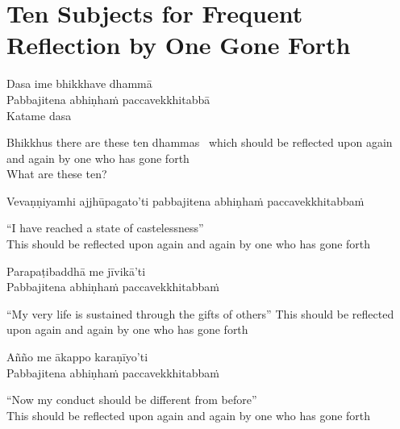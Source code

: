 \section{Ten Subjects for Frequent Reflection by One Gone Forth}
\label{ten-recollections}

\begin{leader}
\end{leader}

Dasa ime bhikkhave dhammā\\
Pabbajitena abhiṇhaṁ paccavekkhitabbā\\
Katame dasa

\begin{english}
  Bhikkhus there are these ten dhammas
  \breathmark\ which should be reflected upon again and again by one who has gone forth\\
  What are these ten?
\end{english}

Vevaṇṇiyamhi ajjhūpagato'ti pabbajitena abhiṇhaṁ paccavekkhitabbaṁ

\begin{english}
  “I have reached a state of castelessness”\\
  This should be reflected upon again and again by one who has gone forth
\end{english}

Parapaṭibaddhā me jīvikā’ti\\
Pabbajitena abhiṇhaṁ paccavekkhitabbaṁ

\begin{english}
  “My very life is sustained through the gifts of others”
  This should be reflected upon again and again by one who has gone forth
\end{english}

Añño me ākappo karaṇīyo'ti\\
Pabbajitena abhiṇhaṁ paccavekkhitabbaṁ

\begin{english}
  “Now my conduct should be different from before”\\
  This should be reflected upon again and again by one who has gone forth
\end{english}

